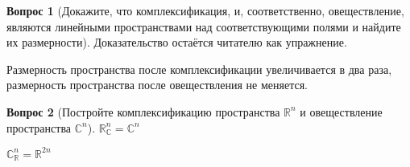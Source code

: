 \documentclass[a4paper,11pt]{article}
\theoremstyle{remark}
\theoremstyle{definition}
\newtheorem{question}{Вопрос}
\numberwithin{question}{subsection}
\begin{document}
\begin{question}[Докажите, что комплексификация, и, соответственно, овеществление, являются линейными пространствами над соответствующими полями и найдите их размерности]
Доказательство остаётся читателю как упражнение.

Размерность пространства после комплексификации увеличивается в два раза, размерность пространства после овеществления не меняется.
\end{question}


\begin{question}[Постройте комплексификацию пространства \(\mathbb{R}^n\) и овеществление пространства \(\mathbb{C}^n\)]
\(\mathbb{R}^n_{\mathbb{C}} = \mathbb{C}^n\)

\(\mathbb{C}^n_{\mathbb{R}} = \mathbb{R}^{2n}\)
\end{question}
\end{document}
